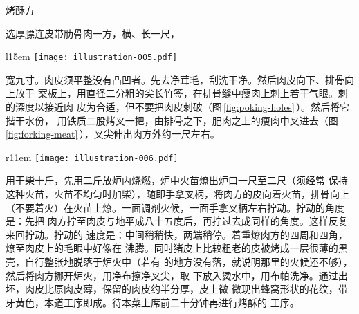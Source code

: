 \begin{recipe}{烤酥方}

\ingredients


\preparation

\step[选料及处理] 选厚膘连皮带肋骨肉一方，横、长一尺，
\begin{wrapfigure}[9]{l}{15em}%
\centering%
\vspace{-.875\baselineskip}%
\texttt{[image: illustration-005.pdf]}%
\vspace{-.125\baselineskip}%
\caption{刺气眼}
\label{fig:poking-holes}
\end{wrapfigure}
宽九寸。肉皮须平整没有凸凹者。先去净茸毛，刮洗干净。然后肉皮向下、排骨向上放于
案板上，用直径二分粗的尖长竹签，在排骨缝中瘦肉上刺上若干气眼。刺的深度以接近肉
皮为合适，但不要把肉皮刺破（图\,\ref{fig:poking-holes}\,）。然后将它揩干水份，
用铁质二股烤叉一把，由排骨之下，肥肉之上的痩肉中叉进去（图\,%
\ref{fig:forking-meat}\,），叉尖伸出肉方外约一尺左右。

\begin{wrapfigure}[13]{r}{11em}%
\centering%
\vspace{-2\baselineskip}%
\texttt{[image: illustration-006.pdf]}%
\vspace{-.625\baselineskip}%
\caption{叉肉}
\label{fig:forking-meat}
\end{wrapfigure}
%

\step[出坯] 用干柴十斤，先用二斤放炉内烧燃，炉中火苗燎出炉口一尺至二尺（须经常
保持这种火苗，火苗不均匀时加柴），随即手拿叉柄，将肉方的皮向着火苗，排骨向上
（不要着火）在火苗上燎。一面调剂火候，一面手拿叉柄左右拧动。拧动的角度是：先把
肉方拧至肉皮与地平成八十五度后，再拧过去成同样的角度。这样反复来回拧动。拧动的
速度是：中间稍稍快，两端稍停。着重燎肉方的四周和四角，燎至肉皮上的毛眼中好像在
沸腾。同时猪皮上比较粗老的皮被烤成一层很薄的黑壳，自行整张地脱落于炉火中（若有
的地方没有落，就说明那里的火候还不够），然后将肉方挪开炉火，用净布擦净叉尖，取
下放入烫水中，用布帕洗净。通过出坯，肉皮比原肉皮薄，保留的肉皮约半分厚，皮上微
微现出蜂窝形状的花纹，带牙黄色，本道工序即成。待本菜上席前二十分钟再进行烤酥的
工序。


\end{recipe}
